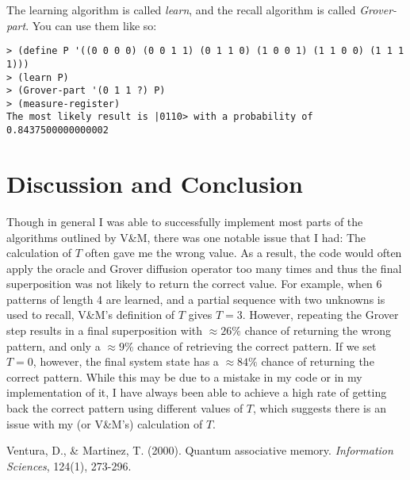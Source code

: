 \documentclass[11pt]{article}
\begin{document}
The learning algorithm is called \textit{learn}, and the recall algorithm is called \textit{Grover-part}. You can use them like so:

\begin{lstlisting}
> (define P '((0 0 0 0) (0 0 1 1) (0 1 1 0) (1 0 0 1) (1 1 0 0) (1 1 1 1)))
> (learn P)
> (Grover-part '(0 1 1 ?) P)
> (measure-register)
The most likely result is |0110> with a probability of 0.8437500000000002
\end{lstlisting}

\section{Discussion and Conclusion}

Though in general I was able to successfully implement most parts of the algorithms outlined by V\&M, there was one notable issue that I had: The calculation of $T$ often gave me the wrong value. As a result, the code would often apply the oracle and Grover diffusion operator too many times and thus the final superposition was not likely to return the correct value. For example, when 6 patterns of length 4 are learned, and a partial sequence with two unknowns is used to recall, V\&M's definition of $T$ gives $T=3$. However, repeating the Grover step results in a final superposition with $\approx26\%$ chance of returning the wrong pattern, and only a $\approx9\%$ chance of retrieving the correct pattern. If we set $T=0$, however, the final system state has a $\approx84\%$ chance of returning the correct pattern. While this may be due to a mistake in my code or in my implementation of it, I have always been able to achieve a high rate of getting back the correct pattern using different values of $T$, which suggests there is an issue with my (or V\&M's) calculation of $T$.

\begin{thebibliography}{9}

	Ventura, D., \& Martinez, T. (2000). Quantum associative memory. \emph{Information Sciences}, 124(1), 273-296.

\end{thebibliography}
\end{document}
